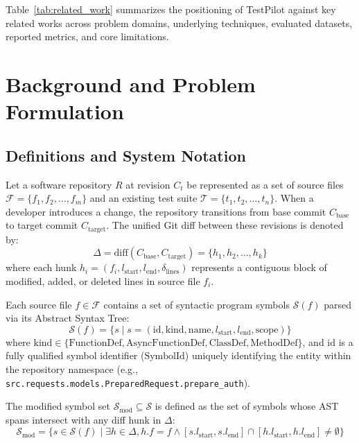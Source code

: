 \documentclass[12pt,onecolumn,draftclsnofoot]{IEEEtran}
\begin{document}
Table~\ref{tab:related_work} summarizes the positioning of TestPilot against key related works across problem domains, underlying techniques, evaluated datasets, reported metrics, and core limitations.

\section{Background and Problem Formulation}
\label{sec:formulation}

\subsection{Definitions and System Notation}
Let a software repository $R$ at revision $C_t$ be represented as a set of source files $\mathcal{F} = \{f_1, f_2, \dots, f_m\}$ and an existing test suite $\mathcal{T} = \{t_1, t_2, \dots, t_n\}$. When a developer introduces a change, the repository transitions from base commit $C_{\text{base}}$ to target commit $C_{\text{target}}$. The unified Git diff between these revisions is denoted by:
\begin{equation}
\Delta = \text{diff}(C_{\text{base}}, C_{\text{target}}) = \{h_1, h_2, \dots, h_k\}
\end{equation}
where each hunk $h_i = (f_i, l_{\text{start}}, l_{\text{end}}, \delta_{\text{lines}})$ represents a contiguous block of modified, added, or deleted lines in source file $f_i$.

Each source file $f \in \mathcal{F}$ contains a set of syntactic program symbols $\mathcal{S}(f)$ parsed via its Abstract Syntax Tree:
\begin{equation}
\mathcal{S}(f) = \{s \mid s = (\text{id}, \text{kind}, \text{name}, l_{\text{start}}, l_{\text{end}}, \text{scope})\}
\end{equation}
where $\text{kind} \in \{\text{FunctionDef}, \text{AsyncFunctionDef}, \text{ClassDef}, \text{MethodDef}\}$, and $\text{id}$ is a fully qualified symbol identifier ($\text{SymbolId}$) uniquely identifying the entity within the repository namespace (e.g., \texttt{src.requests.models.PreparedRequest.prepare\_auth}).

The modified symbol set $\mathcal{S}_{\text{mod}} \subseteq \mathcal{S}$ is defined as the set of symbols whose AST spans intersect with any diff hunk in $\Delta$:
\begin{equation}
\mathcal{S}_{\text{mod}} = \{s \in \mathcal{S}(f) \mid \exists h \in \Delta, h.f = f \land [s.l_{\text{start}}, s.l_{\text{end}}] \cap [h.l_{\text{start}}, h.l_{\text{end}}] \neq \emptyset\}
\end{equation}
\end{document}
